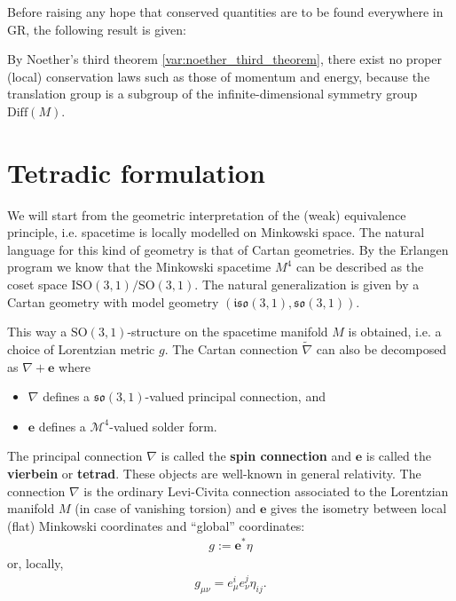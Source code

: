     Before raising any hope that conserved quantities are to be found everywhere in GR, the following result is given:
    \begin{property}
        By Noether's third theorem \ref{var:noether_third_theorem}, there exist no proper (local) conservation laws such as those of momentum and energy, because the translation group is a subgroup of the infinite-dimensional symmetry group $\mathrm{Diff}(M)$.
    \end{property}

\section{Tetradic formulation}

    We will start from the geometric interpretation of the (weak) equivalence principle, i.e. spacetime is locally modelled on Minkowski space. The natural language for this kind of geometry is that of Cartan geometries. By the Erlangen program we know that the Minkowski spacetime $M^4$ can be described as the coset space $\mathrm{ISO}(3,1)/\mathrm{SO}(3,1)$. The natural generalization is given by a Cartan geometry with model geometry $(\mathfrak{iso}(3,1),\mathfrak{so}(3,1))$.

    \begin{property}
        This way a $\mathrm{SO}(3,1)$-structure on the spacetime manifold $M$ is obtained, i.e. a choice of Lorentzian metric $g$. The Cartan connection $\widetilde{\nabla}$ can also be decomposed as $\nabla+\mathbf{e}$ where
        \begin{itemize}
            \item $\nabla$ defines a $\mathfrak{so}(3,1)$-valued principal connection, and
            \item $\mathbf{e}$ defines a $\mathcal{M}^4$-valued solder form.
        \end{itemize}
        The principal connection $\nabla$ is called the \textbf{spin connection} and $\mathbf{e}$ is called the \textbf{vierbein} or \textbf{tetrad}. These objects are well-known in general relativity. The connection $\nabla$ is the ordinary Levi-Civita connection associated to the Lorentzian manifold $M$ (in case of vanishing torsion) and $\mathbf{e}$ gives the isometry between local (flat) Minkowski coordinates and ``global'' coordinates:
        \begin{gather}
            g := \mathbf{e}^*\eta
        \end{gather}
        or, locally,
        \begin{gather}
            g_{\mu\nu} = e^i_\mu e^j_\nu\eta_{ij}.
        \end{gather}
    \end{property}

